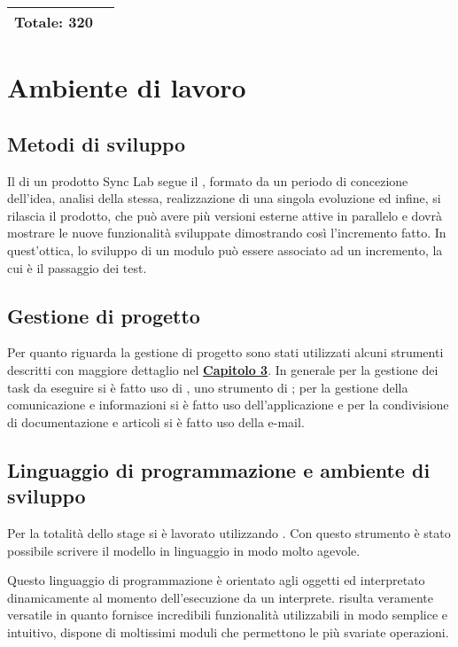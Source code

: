 \begin{center}
\begin{tabular}{|l|l|c l|}
		\hline
																	
		\multicolumn{2}{|l|}{\textbf{Totale: 320}} & \multicolumn{2}{l|}{}\\
		\hline
																												
	\end{tabular}
	\label{tableofwork}  
\end{center}
\newpage
\section{Ambiente di lavoro}
\subsection{Metodi di sviluppo}
Il  di un prodotto Sync Lab segue il , formato da un periodo di concezione dell'idea, analisi della stessa, realizzazione di una singola evoluzione ed infine, si rilascia il prodotto, che può avere più versioni esterne attive in parallelo e dovrà mostrare le nuove funzionalità sviluppate dimostrando così l'incremento fatto. In quest'ottica, lo sviluppo di un modulo può essere associato ad un incremento, la cui  è il passaggio dei test.


\subsection{Gestione di progetto}
Per quanto riguarda la gestione di progetto sono stati utilizzati alcuni strumenti descritti con maggiore dettaglio nel \hyperlink{(chap:capitolo6)}{\textbf{Capitolo 3}}. In generale per la gestione dei task da eseguire si è fatto uso di , uno strumento di ; per la gestione della comunicazione e informazioni si è fatto uso dell'applicazione  e per la condivisione di documentazione e articoli si è fatto uso della e-mail.
	
\subsection{Linguaggio di programmazione e ambiente di sviluppo}
Per la totalità dello stage si è lavorato utilizzando 
. Con questo strumento è stato possibile scrivere il modello in linguaggio  in modo molto agevole. 

Questo linguaggio di programmazione è orientato agli oggetti ed interpretato dinamicamente al momento dell'esecuzione da un interprete.  risulta veramente versatile in quanto fornisce incredibili funzionalità utilizzabili in modo semplice e intuitivo, dispone di moltissimi moduli che permettono le più svariate operazioni.
\newpage

